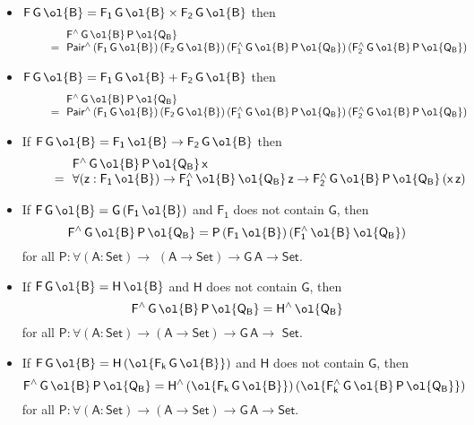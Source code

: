 \documentclass[sigplan,screen]{acmart}
\begin{document}
\begin{itemize}
\item $\mathsf{F\,G\,\ol{B} = F_1\,G\,\ol{B} \times F_2\,G\,\ol{B}}$ then
\[\begin{array}{ll}
& \!\!\mathsf{F^{\wedge}\,G\,\ol{B}\,P\,\ol{Q_B}}\\
\quad\quad= & \!\!\mathsf{Pair^{\wedge}\,(F_1\,G\,\ol{B})\, (F_2\,G\,\ol{B})\,
  (F_1^{\wedge}\,G\,\ol{B}\,P\,\ol{Q_B})\,
  (F_2^{\wedge}\,G\,\ol{B}\,P\,\ol{Q_B})}
  \end{array}\]
\item $\mathsf{F\,G\,\ol{B} = F_1\,G\,\ol{B} + F_2\,G\,\ol{B}}$ then
\[\begin{array}{ll}
& \!\!\mathsf{F^{\wedge}\,G\,\ol{B}\,P\,\ol{Q_B}}\\
\quad\quad= & \!\!\mathsf{Pair^{\wedge}\,(F_1\,G\,\ol{B})\, (F_2\,G\,\ol{B})\,
  (F_1^{\wedge}\,G\,\ol{B}\,P\,\ol{Q_B})\,
  (F_2^{\wedge}\,G\,\ol{B}\,P\,\ol{Q_B})}
  \end{array}\]
\item If $\mathsf{F\,G\,\ol{B} = F_1\,\ol{B} \to F_2\,G\,\ol{B}}$ then
  \[\begin{array}{ll}
  & \!\!\mathsf{F^{\wedge}\,G\,\ol{B}\,P\,\ol{Q_B}\,x}\\
  \quad\quad= & \!\!\mathsf{\forall (z :
  F_1\,\ol{B}) \to F_1^{\wedge}\,\ol{B}\,\ol{Q_B}\,z \to
  F_2^{\wedge}\,G\,\ol{B}\,P\,\ol{Q_B}\,(x\,z)}
  \end{array}\]
\item If $\mathsf{F\,G\,\ol{B} = G\,(F_1\,\ol{B})}$ and $\mathsf{F_1}$
  does not contain $\mathsf{G}$, then
  \[\mathsf{F^{\wedge}\,G\,\ol{B}\,P\,\ol{Q_B} = P \,(F_1\,\ol{B})\,
    (F_1^{\wedge}\,\ol{B}\,\ol{Q_B})}\] for all $\mathsf{P : \forall (A
    : Set)\to}$ $\mathsf{(A \to Set) \to G\,A \to Set}$.
\item If $\mathsf{F\,G\,\ol{B} = H\,\ol{B}}$ and $\mathsf{H}$ does not
  contain $\mathsf{G}$, then
  \[\mathsf{F^{\wedge}\,G\,\ol{B}\,P\,\ol{Q_B} = H^\wedge\,\ol{Q_B}}\]
  for all $\mathsf{P : \forall (A : Set)\to(A \to Set) \to G\,A \to}$
  $\mathsf{ Set}$.
\item If $\mathsf{F\,G\,\ol{B} = H\, (\ol{F_k\,G\,\ol{B}})}$ and
  $\mathsf{H}$ does not contain $\mathsf{G}$, then
  \[\mathsf{F^{\wedge}\,G\,\ol{B}\,P\,\ol{Q_B} = H^{\wedge}\,
  (\ol{F_k\,G\,\ol{B}})\,
    (\ol{F_k^{\wedge}\,G\,\ol{B}\,P\,\ol{Q_B}})}\] for all $\mathsf{P
    : \forall (A : Set)\to(A \to Set) \to G\,A \to Set}$.
\end{itemize}  
\end{document}

